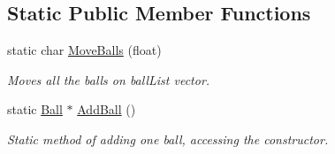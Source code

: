 \subsection*{Static Public Member Functions}
\begin{DoxyCompactItemize}
\item 
static char \hyperlink{class_ball_a8625cadb0e2072ad743325696d326176}{Move\+Balls} (float)
\begin{DoxyCompactList}\small\item\em Moves all the balls on ball\+List vector. \end{DoxyCompactList}\item 
\mbox{\label{class_ball_ad8cba82a576b26e3f2280e3fc50ba863}} 
static \hyperlink{class_ball}{Ball} $\ast$ \hyperlink{class_ball_ad8cba82a576b26e3f2280e3fc50ba863}{Add\+Ball} ()
\begin{DoxyCompactList}\small\item\em Static method of adding one ball, accessing the constructor. \end{DoxyCompactList}\end{DoxyCompactItemize}
